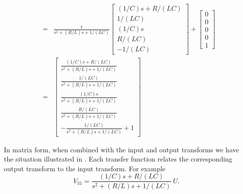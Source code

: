 \begin{slide}
\begin{eqnarray*} &=& \frac{1}{s^2 + (R/L)s
+1/(LC)}\left[\begin{array}{c}
  (1/C)s+R/(LC) \\
  1/(LC) \\
  (1/C)s \\
  R/(LC) \\
  -1/(LC)
\end{array}\right] + \left[\begin{array}{c}
  0 \\
  0 \\
  0 \\
  0 \\
  1
\end{array} \right]\\
&=& \left[\begin{array}{c}
  \frac{(1/C)s+R/(LC)}{s^2 + (R/L)s
+1/(LC)} \\
  \frac{1/(LC)}{s^2 + (R/L)s
+1/(LC)} \\
  \frac{(1/C)s}{s^2 + (R/L)s
+1/(LC)} \\
  \frac{R/(LC)}{s^2 + (R/L)s
+1/(LC)} \\
  -\frac{1/(LC)}{s^2 + (R/L)s
+1/(LC)}+1
\end{array}\right]
\end{eqnarray*}
\end{slide}

In matrix form, when combined with the input and output transforms we
have the situation illustrated in .
Each transfer function relates the corresponding output transform
to the input transform. For example
\[V_{31}= \frac{(1/C)s+R/(LC)}{s^2 + (R/L)s
+1/(LC)}\ U.\]

